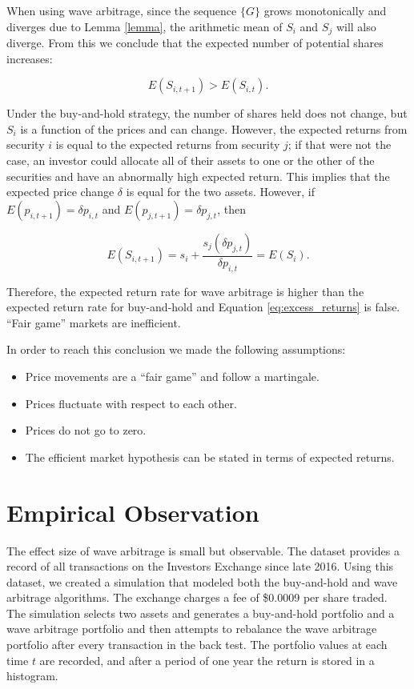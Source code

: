 \documentclass{article}
\begin{document}
When using wave arbitrage, since the sequence $\{G\}$ grows monotonically and
diverges due to Lemma \ref{lemma}, the arithmetic mean of $S_i$ and $S_j$ will
also diverge. From this we conclude that the expected number of potential
shares increases:

\begin{equation}
  E(S_{i,t+1}) > E(S_{i,t}).
\end{equation}

Under the buy-and-hold strategy, the number of shares held does not change, but
$S_i$ is a function of the prices and can change. However, the expected returns
from security $i$ is equal to the expected returns from security $j$; if that
were not the case, an investor could allocate all of their assets to one or the
other of the securities and have an abnormally high expected return. This
implies that the expected price change $\delta$ is equal for the two assets.
However, if $E (p_{i,t+1}) = \delta p_{i,t}$ and $E (p_{j,t+1}) = \delta
p_{j,t}$, then

\begin{equation}
  E (S_{i,t+1}) = s_i + \frac{s_j (\delta p_{j,t})}{\delta p_{i,t}} = E (S_{i}).
\end{equation}

Therefore, the expected return rate for wave arbitrage is higher than the
expected return rate for buy-and-hold and Equation \ref{eq:excess_returns} is
false. ``Fair game'' markets are inefficient.

In order to reach this conclusion we made the following assumptions:

\begin{itemize}
  \item Price movements are a ``fair game'' and follow a martingale.
  \item Prices fluctuate with respect to each other.
  \item Prices do not go to zero.
  \item The efficient market hypothesis can be stated in terms of expected
        returns.
\end{itemize}

\section{Empirical Observation}

The effect size of wave arbitrage is small but observable. The \citet{IEX}
dataset provides a record of all transactions on the Investors Exchange since
late 2016. Using this dataset, we created a simulation that modeled both the
buy-and-hold and wave arbitrage algorithms. The exchange charges a fee of
\$0.0009 per share traded. The simulation selects two assets and generates a
buy-and-hold portfolio and a wave arbitrage portfolio and then attempts to
rebalance the wave arbitrage portfolio after every transaction in the back
test. The portfolio values at each time $t$ are recorded, and after a period of
one year the return is stored in a histogram.
\end{document}
